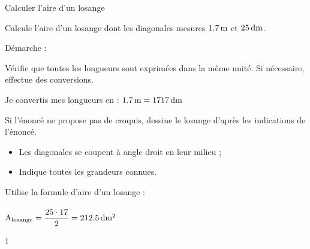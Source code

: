 \documentclass[a4paper,11pt]{report}
\let\oldcenter\center
\let\oldendcenter\endcenter
\renewenvironment{center}{\setlength\topsep{-10pt}\oldcenter}{\oldendcenter}
\begin{document}
\begin{resolu}{Calculer l'aire d'un losange}{
		Calcule l'aire d'un losange dont les diagonales mesures $\tunit{1,7}{m}$ et $\tunit{25}{dm}$.

Démarche :
\begin{tasks}
    \task Vérifie que toutes les longueurs sont exprimées dans la même unité. Si nécessaire, effectue des conversions.
    
    {\color{blue} Je convertis mes longueurs en  : $\tunit{1,7}{m}=17\tunit{17}{dm}$}
    
    \task Si l'énoncé ne propose pas de croquis, dessine le losange d'après les indications de l'énoncé.
    \begin{itemize}
        \item Les diagonales se coupent à angle droit en leur milieu ;
        \item Indique toutes les grandeurs connues.
    \end{itemize}
    \begin{center}
    \end{center}
\vspace{-0.8cm}
    \task Utilise la formule d'aire d'un losange : \\
    
     \\
      
    $\textrm{A}_{\textrm{losange}}=\dfrac{25\cdot17}{2}=\tunit{212,5}{dm^2}$
\end{tasks}
}{1}   
\end{resolu}
\end{document}
